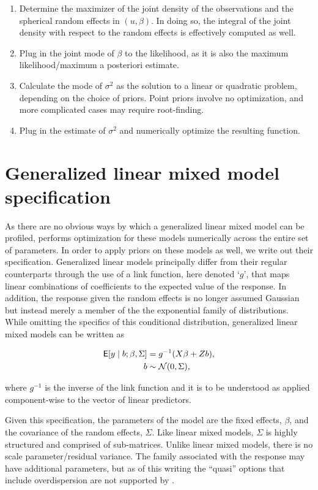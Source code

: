 \documentclass[article,shortnames]{jss}
\begin{document}
\begin{enumerate}
\item Determine the maximizer of the joint density of the
  observations and the spherical random effects in $(u, \beta)$. In
  doing so, the integral of the joint density with respect to the
  random effects is effectively computed as well.
\item Plug in the joint mode of $\beta$ to the likelihood, as it is also the maximum
  likelihood/maximum a posteriori estimate.
\item Calculate the mode of $\sigma^2$ as the solution to a linear or
  quadratic problem, depending on the choice of priors. Point priors
  involve no optimization, and more complicated cases may require root-finding.
\item Plug in the estimate of $\sigma^2$ and numerically optimize the
  resulting function.
\end{enumerate}

\section{Generalized linear mixed model specification}
\label{sec:glmms}

As there are no obvious ways by which a generalized linear mixed model
can be profiled,  performs optimization for these models
numerically across the entire set of parameters. In order to apply priors on
these models as well, we write out their
specification. Generalized linear models principally differ from their
regular counterparts through the use of a link function, here denoted
`$g$', that maps linear combinations of coefficients to the expected
value of the response. In addition, the response given the random
effects is no longer assumed
Gaussian but instead merely a member of the the exponential family of
distributions. While omitting the specifics of this conditional distribution,
generalized linear mixed models can be written as

\begin{align*}
  \mathsf{E}[y \mid b; \beta, \Sigma] & = g^{-1}(X\beta + Zb), \\
  b & \sim \mathcal{N}(0, \Sigma),
\end{align*}

\noindent where $g^{-1}$ is the inverse of the link function and it is
to be understood as applied component-wise to the vector of linear predictors.

Given this specification, the parameters of the model are the
fixed effects, $\beta$, and the covariance of the random effects,
$\Sigma$. Like linear mixed models, $\Sigma$ is highly structured and
comprised of sub-matrices. Unlike linear mixed models, there is no scale
parameter/residual variance. The family associated with the response
may have additional parameters, but as of this writing the ``quasi''
options that include overdispersion are not supported by .
\end{document}
